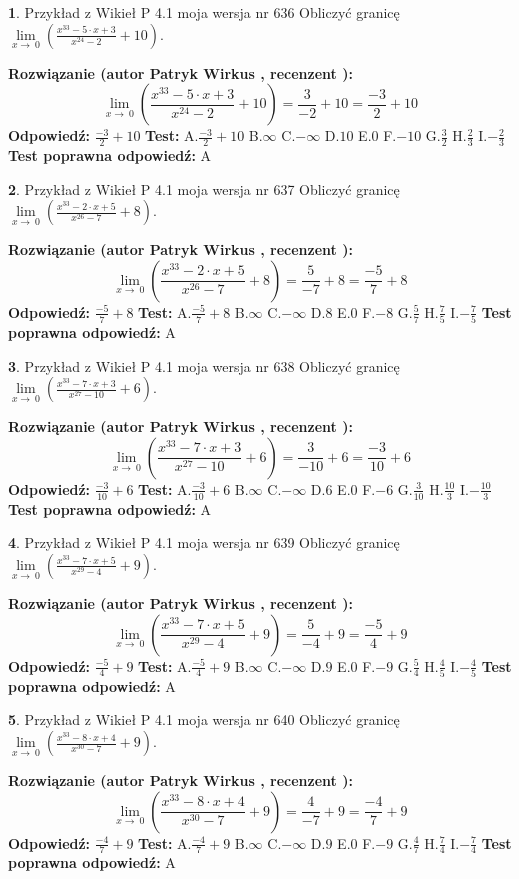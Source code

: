 \documentclass[12pt, a4paper]{article}
\theoremstyle{definition} %
\newtheorem{zad}{}
\newcommand{\zadStart}[1]{\begin{zad}#1\newline}
\newcommand{\zadStop}{\end{zad}}
\newcommand{\rozwStart}[2]{\noindent \textbf{Rozwiązanie (autor #1 , recenzent #2): }\newline}
\newcommand{\rozwStop}{\newline}
\newcommand{\odpStart}{\noindent \textbf{Odpowiedź:}\newline}
\newcommand{\odpStop}{\newline}
\newcommand{\testStart}{\noindent \textbf{Test:}\newline}
\newcommand{\testStop}{\newline}
\newcommand{\kluczStart}{\noindent \textbf{Test poprawna odpowiedź:}\newline}
\newcommand{\kluczStop}{\newline}
\begin{document}
\zadStart{Przykład z Wikieł P 4.1 moja wersja nr 636}
Obliczyć granicę $\lim\limits_{x\to\ 0}(\frac{x^{33}-5 \cdot x +3}{x^{24}-2}+10)$.
\zadStop
\rozwStart{Patryk Wirkus}{}
$$\lim\limits_{x\to\ 0}(\frac{x^{33}-5 \cdot x +3}{x^{24}-2}+10)=\frac{3}{-2}+10=\frac{-3}{2}+10$$
\rozwStop
\odpStart
$\frac{-3}{2}+10$
\odpStop
\testStart
A.$\frac{-3}{2}+10$
B.$\infty$
C.$-\infty$
D.$10$
E.$0$
F.$-10$
G.$\frac{3}{2}$
H.$\frac{2}{3}$
I.$-\frac{2}{3}$
\testStop
\kluczStart
A
\kluczStop



\zadStart{Przykład z Wikieł P 4.1 moja wersja nr 637}
Obliczyć granicę $\lim\limits_{x\to\ 0}(\frac{x^{33}-2 \cdot x +5}{x^{26}-7}+8)$.
\zadStop
\rozwStart{Patryk Wirkus}{}
$$\lim\limits_{x\to\ 0}(\frac{x^{33}-2 \cdot x +5}{x^{26}-7}+8)=\frac{5}{-7}+8=\frac{-5}{7}+8$$
\rozwStop
\odpStart
$\frac{-5}{7}+8$
\odpStop
\testStart
A.$\frac{-5}{7}+8$
B.$\infty$
C.$-\infty$
D.$8$
E.$0$
F.$-8$
G.$\frac{5}{7}$
H.$\frac{7}{5}$
I.$-\frac{7}{5}$
\testStop
\kluczStart
A
\kluczStop



\zadStart{Przykład z Wikieł P 4.1 moja wersja nr 638}
Obliczyć granicę $\lim\limits_{x\to\ 0}(\frac{x^{33}-7 \cdot x +3}{x^{27}-10}+6)$.
\zadStop
\rozwStart{Patryk Wirkus}{}
$$\lim\limits_{x\to\ 0}(\frac{x^{33}-7 \cdot x +3}{x^{27}-10}+6)=\frac{3}{-10}+6=\frac{-3}{10}+6$$
\rozwStop
\odpStart
$\frac{-3}{10}+6$
\odpStop
\testStart
A.$\frac{-3}{10}+6$
B.$\infty$
C.$-\infty$
D.$6$
E.$0$
F.$-6$
G.$\frac{3}{10}$
H.$\frac{10}{3}$
I.$-\frac{10}{3}$
\testStop
\kluczStart
A
\kluczStop



\zadStart{Przykład z Wikieł P 4.1 moja wersja nr 639}
Obliczyć granicę $\lim\limits_{x\to\ 0}(\frac{x^{33}-7 \cdot x +5}{x^{29}-4}+9)$.
\zadStop
\rozwStart{Patryk Wirkus}{}
$$\lim\limits_{x\to\ 0}(\frac{x^{33}-7 \cdot x +5}{x^{29}-4}+9)=\frac{5}{-4}+9=\frac{-5}{4}+9$$
\rozwStop
\odpStart
$\frac{-5}{4}+9$
\odpStop
\testStart
A.$\frac{-5}{4}+9$
B.$\infty$
C.$-\infty$
D.$9$
E.$0$
F.$-9$
G.$\frac{5}{4}$
H.$\frac{4}{5}$
I.$-\frac{4}{5}$
\testStop
\kluczStart
A
\kluczStop



\zadStart{Przykład z Wikieł P 4.1 moja wersja nr 640}
Obliczyć granicę $\lim\limits_{x\to\ 0}(\frac{x^{33}-8 \cdot x +4}{x^{30}-7}+9)$.
\zadStop
\rozwStart{Patryk Wirkus}{}
$$\lim\limits_{x\to\ 0}(\frac{x^{33}-8 \cdot x +4}{x^{30}-7}+9)=\frac{4}{-7}+9=\frac{-4}{7}+9$$
\rozwStop
\odpStart
$\frac{-4}{7}+9$
\odpStop
\testStart
A.$\frac{-4}{7}+9$
B.$\infty$
C.$-\infty$
D.$9$
E.$0$
F.$-9$
G.$\frac{4}{7}$
H.$\frac{7}{4}$
I.$-\frac{7}{4}$
\testStop
\kluczStart
A
\kluczStop
\end{document}
